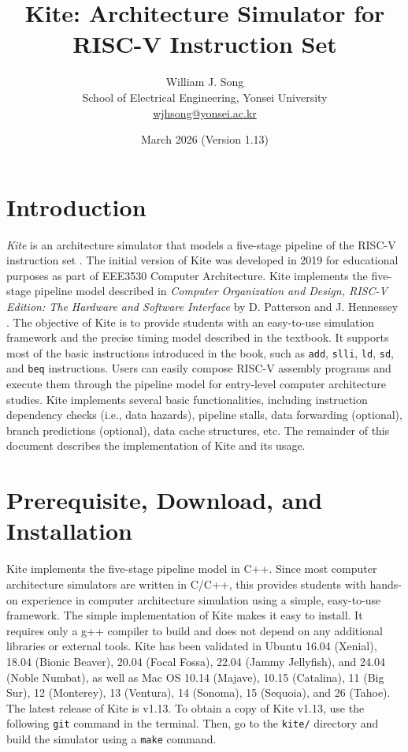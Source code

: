 \documentclass[10pt]{article}
\begin{document}
\title{Kite: Architecture Simulator for RISC-V Instruction Set}
\author{William J. Song\\
        School of Electrical Engineering, Yonsei University\\
        \href{mailto:wjhsong@yonsei.ac.kr}{wjhsong@yonsei.ac.kr}}
\date{March 2026 (Version 1.13)}
\maketitle


\section{Introduction} \label{sec:introduction}
\emph{Kite} is an architecture simulator that models a five-stage pipeline of the RISC-V instruction set \cite{waterman_riscv2019}.
The initial version of Kite was developed in 2019 for educational purposes as part of EEE3530 Computer Architecture.
Kite implements the five-stage pipeline model described in \emph{Computer Organization and Design, RISC-V Edition: The Hardware and Software Interface} by D. Patterson and J. Hennessey \cite{patterson_morgan2017}.
The objective of Kite is to provide students with an easy-to-use simulation framework and the precise timing model described in the textbook.
It supports most of the basic instructions introduced in the book, such as {\tt\small add}, {\tt\small slli}, {\tt\small ld}, {\tt\small sd}, and {\tt\small beq} instructions.
Users can easily compose RISC-V assembly programs and execute them through the pipeline model for entry-level computer architecture studies.
Kite implements several basic functionalities, including instruction dependency checks (i.e., data hazards), pipeline stalls, data forwarding (optional), branch predictions (optional), data cache structures, etc.
The remainder of this document describes the implementation of Kite and its usage.


\section{Prerequisite, Download, and Installation} \label{sec:install}
Kite implements the five-stage pipeline model in C++.
Since most computer architecture simulators are written in C/C++, this provides students with hands-on experience in computer architecture simulation using a simple, easy-to-use framework.
The simple implementation of Kite makes it easy to install.
It requires only a g++ compiler to build and does not depend on any additional libraries or external tools.
Kite has been validated in Ubuntu 16.04 (Xenial), 18.04 (Bionic Beaver), 20.04 (Focal Fossa), 22.04 (Jammy Jellyfish), and 24.04 (Noble Numbat), as well as Mac OS 10.14 (Majave), 10.15 (Catalina), 11 (Big Sur), 12 (Monterey), 13 (Ventura), 14 (Sonoma), 15 (Sequoia), and 26 (Tahoe).
The latest release of Kite is v1.13.
To obtain a copy of Kite v1.13, use the following {\tt\small git} command in the terminal.
Then, go to the {\tt\small kite/} directory and build the simulator using a {\tt\small make} command.
\end{document}
